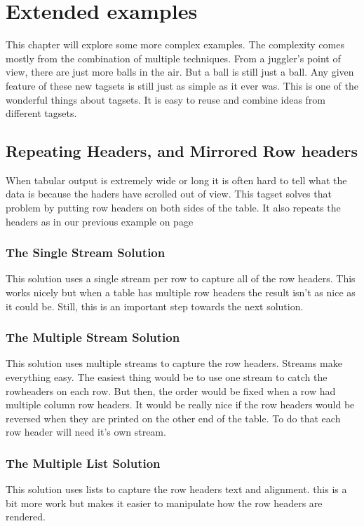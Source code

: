 \chapter{Extended examples}
This chapter will explore some more complex examples.  The
complexity comes mostly from the combination of multiple
techniques.  From a juggler's point
of view, there are just more balls in the air.  But a ball is
still just a ball.  Any given feature of these new tagsets
is still just as simple as it ever was.  This is one of the
wonderful things about tagsets.  It is easy to reuse and 
combine ideas from different tagsets.

\section{Repeating Headers, and Mirrored Row headers}
When tabular output is extremely wide or long it is often hard to tell
what the data is because the haders have scrolled out of view.  This
tagset solves that problem by putting row headers on both sides of the
table.  It also repeats the headers as in our previous example on page
\pageref{repeat3}

\subsection{The Single Stream Solution}
This solution uses a single stream per row to capture all of the row headers.
This works nicely but when a table has multiple row headers the result isn't
as nice as it could be.  Still, this is an important step towards the next
solution.

\subsection{The Multiple Stream Solution}
This solution uses multiple streams to capture the row headers.  Streams
make everything easy.  The easiest thing would be to use one stream to catch
the rowheaders on each row.  But then, the order would be fixed when a row had
multiple column row headers.  It  would be really nice if the row headers would
be reversed when they are printed on the other end of the table.  To do that
each row header will need it's own stream.

\subsection{The Multiple List Solution}
This solution uses lists to capture the row headers text and alignment.
this is a bit more work but makes it easier to manipulate how the row headers
are rendered.

